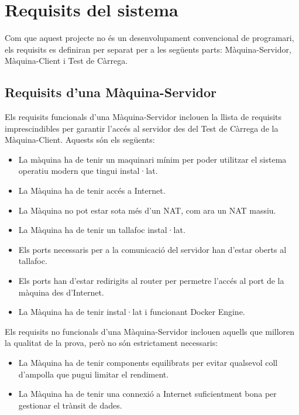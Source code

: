 \chapter{Requisits del sistema}

Com que aquest projecte no és un desenvolupament convencional de programari, els requisits es definiran per separat per a les següents parts: Màquina-Servidor, Màquina-Client i Test de Càrrega.

\section{Requisits d'una Màquina-Servidor}

Els requisits funcionals d'una Màquina-Servidor inclouen la llista de requisits imprescindibles per garantir l'accés al servidor des del Test de Càrrega de la Màquina-Client. Aquests són els següents:

\begin{itemize}
    \item La màquina ha de tenir un maquinari mínim per poder utilitzar el sistema operatiu modern que tingui instal·lat.
    \item La Màquina ha de tenir accés a Internet. 
    \item La Màquina no pot estar sota més d'un NAT\cite{wing_network_2010}, com ara un NAT massiu.\cite{richter_multi-perspective_2016} \item La Màquina ha de tenir un tallafoc instal·lat.
    \item Els ports necessaris per a la comunicació del servidor han d'estar oberts al tallafoc.\cite{liang_evolution_2022}
    \item Els ports han d'estar redirigits al router per permetre l'accés al port de la màquina des d'Internet. 
    \item La Màquina ha de tenir instal·lat i funcionant Docker Engine.  \cite{bashari_rad_introduction_2017}
\end{itemize}

Els requisits no funcionals d'una Màquina-Servidor inclouen aquells que milloren la qualitat de la prova, però no són estrictament necessaris:

\begin{itemize} 
    \item La Màquina ha de tenir components equilibrats per evitar qualsevol coll d'ampolla que pugui limitar el rendiment. \cite{singh_bottleneck_2012}
    \item La Màquina ha de tenir una connexió a Internet suficientment bona per gestionar el trànsit de dades. 
\end{itemize}

